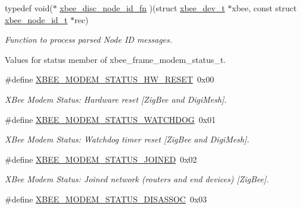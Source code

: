 \begin{DoxyCompactItemize}
typedef void($\ast$ \hyperlink{group__xbee__device_ga55de36532265a72bffa969d5353800d7}{xbee\-\_\-disc\-\_\-node\-\_\-id\-\_\-fn} )(struct \hyperlink{structxbee__dev__t}{xbee\-\_\-dev\-\_\-t} $\ast$xbee, const struct \hyperlink{structxbee__node__id__t}{xbee\-\_\-node\-\_\-id\-\_\-t} $\ast$rec)
\begin{DoxyCompactList}\small\item\em Function to process parsed Node I\-D messages. \end{DoxyCompactList}\end{DoxyCompactItemize}
\label{_amgrp01747264fe7bf50731df0522c351974e}%
Values for {\ttfamily status} member of xbee\-\_\-frame\-\_\-modem\-\_\-status\-\_\-t. \begin{DoxyCompactItemize}
\item 
\hypertarget{group__xbee__device_ga28583d00e888ab4f17206ee70767aafa}{\#define \hyperlink{group__xbee__device_ga28583d00e888ab4f17206ee70767aafa}{X\-B\-E\-E\-\_\-\-M\-O\-D\-E\-M\-\_\-\-S\-T\-A\-T\-U\-S\-\_\-\-H\-W\-\_\-\-R\-E\-S\-E\-T}~0x00}\label{group__xbee__device_ga28583d00e888ab4f17206ee70767aafa}

\begin{DoxyCompactList}\small\item\em X\-Bee Modem Status\-: Hardware reset \mbox{[}Zig\-Bee and Digi\-Mesh\mbox{]}. \end{DoxyCompactList}\item 
\hypertarget{group__xbee__device_gadb8d81ed3b25a11945a7a39a84255d72}{\#define \hyperlink{group__xbee__device_gadb8d81ed3b25a11945a7a39a84255d72}{X\-B\-E\-E\-\_\-\-M\-O\-D\-E\-M\-\_\-\-S\-T\-A\-T\-U\-S\-\_\-\-W\-A\-T\-C\-H\-D\-O\-G}~0x01}\label{group__xbee__device_gadb8d81ed3b25a11945a7a39a84255d72}

\begin{DoxyCompactList}\small\item\em X\-Bee Modem Status\-: Watchdog timer reset \mbox{[}Zig\-Bee and Digi\-Mesh\mbox{]}. \end{DoxyCompactList}\item 
\hypertarget{group__xbee__device_ga2e3f5ffd01da92dd4a25257d8bc005bc}{\#define \hyperlink{group__xbee__device_ga2e3f5ffd01da92dd4a25257d8bc005bc}{X\-B\-E\-E\-\_\-\-M\-O\-D\-E\-M\-\_\-\-S\-T\-A\-T\-U\-S\-\_\-\-J\-O\-I\-N\-E\-D}~0x02}\label{group__xbee__device_ga2e3f5ffd01da92dd4a25257d8bc005bc}

\begin{DoxyCompactList}\small\item\em X\-Bee Modem Status\-: Joined network (routers and end devices) \mbox{[}Zig\-Bee\mbox{]}. \end{DoxyCompactList}\item 
\hypertarget{group__xbee__device_ga5a5b4041876231e1516ccd621bc298db}{\#define \hyperlink{group__xbee__device_ga5a5b4041876231e1516ccd621bc298db}{X\-B\-E\-E\-\_\-\-M\-O\-D\-E\-M\-\_\-\-S\-T\-A\-T\-U\-S\-\_\-\-D\-I\-S\-A\-S\-S\-O\-C}~0x03}\label{group__xbee__device_ga5a5b4041876231e1516ccd621bc298db}


\end{DoxyCompactItemize}
